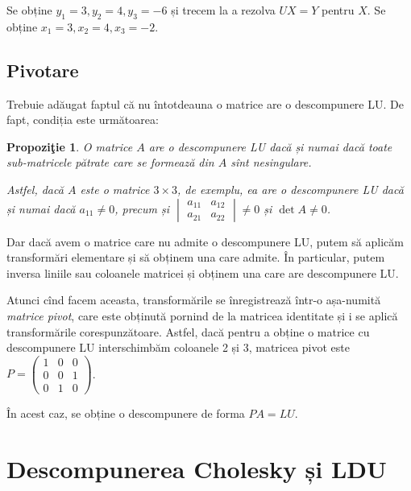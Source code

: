 \documentclass[11pt,a4paper]{article}
\theoremstyle{dotless}
\newtheorem{proposition}{Propozi\c{t}ie}[section]
\theoremstyle{dotlessdr}
\begin{document}
Se obține $y_1 = 3, y_2 = 4, y_3 = -6$ și trecem la a rezolva $UX = Y$ 
pentru $X$. Se obține $x_1 = 3, x_2 = 4, x_3 = -2$.


\subsection{Pivotare}

Trebuie adăugat faptul că nu întotdeauna o matrice are o descompunere LU\@. De fapt, condiția este următoarea:

\begin{proposition}\label{prop:cond-lu}
  O matrice $A$ are o descompunere LU dacă și numai dacă toate sub-matricele
  pătrate care se formează din $A$ sînt nesingulare.

  Astfel, dacă $A$ este o matrice $3 \times 3$, de exemplu, ea are o 
  descompunere LU dacă și numai dacă $a_{11} \neq 0$, precum și 
  $\begin{vmatrix} 
    a_{11} & a_{12} \\ 
    a_{21} & a_{22} 
  \end{vmatrix} \neq 0$
  și $\det A \neq 0$.
\end{proposition}

Dar dacă avem o matrice care nu admite o descompunere LU, putem să aplicăm 
transformări elementare și să obținem una care admite. În particular,
putem inversa liniile sau coloanele matricei și obținem una care are descompunere LU.

Atunci cînd facem aceasta, transformările se înregistrează într-o așa-numită
\emph{matrice pivot}, care este obținută pornind de la matricea identitate și i se
aplică transformările corespunzătoare. Astfel, dacă pentru a obține o matrice
cu descompunere LU interschimbăm coloanele 2 și 3, matricea pivot este
$P = \begin{pmatrix} 1 & 0 & 0 \\ 0 & 0 & 1 \\ 0 & 1 & 0 \end{pmatrix}$.

  În acest caz, se obține o descompunere de forma $PA = LU$.


  \section{Descompunerea Cholesky și LDU}
\end{document}
